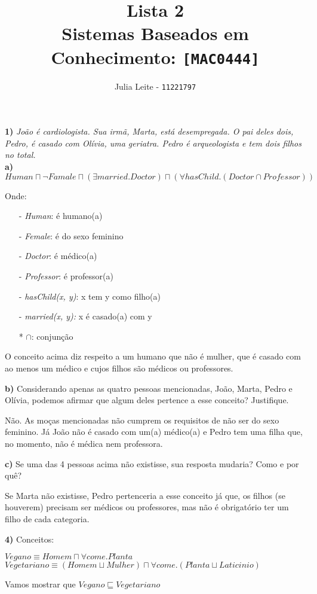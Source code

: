 \documentclass{article}
\title{Lista 2\\
\large Sistemas Baseados em Conhecimento: \texttt{[MAC0444]}}
\author{Julia Leite - \texttt{11221797}}
\begin{document}
    
\maketitle

\textbf{1)} \textit{João é cardiologista. Sua irmã, Marta, está desempregada. O pai deles dois, Pedro, 
é casado com Olívia, uma geriatra. Pedro é arqueologista e tem dois filhos no total.}\\

\textbf{a)} $Human \sqcap \neg Famale \sqcap (\exists married.Doctor) \sqcap (\forall hasChild.(Doctor \cap Professor))$

Onde:

\begin{itemize}
    \item [-] \textit{Human}: é humano(a)
    \item [-] \textit{Female}: é do sexo feminino
    \item [-] \textit{Doctor}: é médico(a)
    \item [-] \textit{Professor}: é professor(a)
    \item [-] \textit{hasChild(x, y)}: x tem y como filho(a)
    \item [-] \textit{married(x, y):} x é casado(a) com y
    \item [*] $\cap$: conjunção 
\end{itemize}

O conceito acima diz respeito a um humano que não é mulher, que é casado com ao menos um médico e cujos filhos são médicos ou professores.

\textbf{b)} Considerando apenas as quatro pessoas mencionadas, João, Marta, Pedro
e Olívia, podemos afirmar que algum deles pertence a esse conceito? Justifique.

Não. As moças mencionadas não cumprem os requisitos de não ser do sexo feminino. Já João não é
casado com um(a) médico(a) e Pedro tem uma filha que, no momento, não é médica nem professora.

\textbf{c)} Se uma das 4 pessoas acima não existisse, sua resposta mudaria? Como e por quê?

Se Marta não existisse, Pedro pertenceria a esse conceito já que, os filhos (se houverem) precisam ser médicos ou 
professores, mas não é obrigatório ter um filho de cada categoria.

\textbf{4)} Conceitos:

$Vegano \equiv Homem \sqcap \forall come.Planta$
$Vegetariano \equiv (Homem \sqcup Mulher) \sqcap \forall come.(Planta \sqcup Laticinio)$

Vamos mostrar que $Vegano \sqsubseteq Vegetariano$
\end{document}
